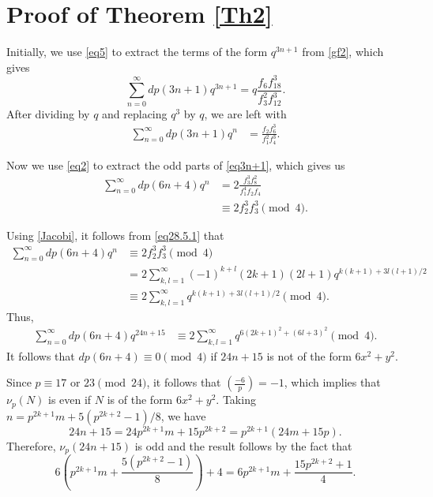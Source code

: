 \documentclass{amsart}
\begin{document}


\section{Proof of Theorem \ref{Th2}}

Initially, we use \eqref{eq5} to extract the terms of the form $q^{3n+1}$ from \eqref{gf2}, which gives
$$\sum_{n=0}^{\infty} dp(3n+1)q^{3n+1} = q\frac{f_{6}f_{18}^3}{f_3^2f_{12}^3}.$$
After dividing by $q$ and replacing $q^3$ by $q$, we are left with
\begin{align}
\sum_{n=0}^{\infty} dp(3n+1)q^{n} & = \frac{f_{2}f_{6}^3}{f_1^2f_{4}^3}. \label{eq3n+1}
\end{align}

Now we use \eqref{eq2} to extract the odd parts of \eqref{eq3n+1}, which gives us
\begin{align}
\sum_{n=0}^{\infty} dp(6n+4)q^{n} & = 2\frac{f_3^3f_8^2}{f_1^4f_2f_4} \nonumber \\
& \equiv 2f_2^3 f_3^3\pmod{4}. \label{eq28.5.1}
\end{align}

Using \eqref{Jacobi}, it follows from \eqref{eq28.5.1} that
\begin{align*}
\sum_{n=0}^{\infty} dp(6n+4)q^{n} & \equiv 2f_2^3f_3^3 \pmod{4}\\
& = 2 \sum_{k,l=1}^{\infty} (-1)^{k+l}(2k+1)(2l+1)q^{k(k+1)+3l(l+1)/2} \\
& \equiv 2\sum_{k,l=1}^{\infty} q^{k(k+1)+3l(l+1)/2} \pmod{4}.
\end{align*}
Thus, 
\begin{align*}
\sum_{n=0}^{\infty} dp(6n+4)q^{24n+15} &  \equiv 2\sum_{k,l=1}^{\infty} q^{6(2k+1)^2+(6l+3)^2} \pmod{4}.
\end{align*}
It follows that $dp(6n+4) \equiv 0 \pmod{4}$ if $24n+15$ is not of the form $6x^2+y^2$. 

Since $p \equiv 17 \mbox{ or } 23 \pmod{24}$, it follows that $\displaystyle \left( \frac{-6}{p}\right) = -1$, which implies that $\nu_p(N)$ is even if $N$ is of the form $6x^2+y^2$. Taking $n = p^{2k+1}m + 5({p^{2k+2}-1})/{8}$, we have 
$$24n+15 = 24p^{2k+1}m + 15p^{2k+2} = p^{2k+1}(24m+15p).$$
Therefore, $\nu_p(24n+15)$ is odd and the result follows by the fact that
$$6\left( p^{2k+1}m + \frac{5(p^{2k+2}-1)}{8} \right) + 4 = 6p^{2k+1}m + \frac{15p^{2k+2}+1}{4}.$$
\end{document}
